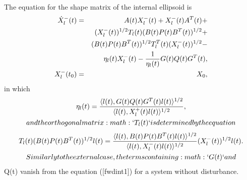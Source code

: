 \documentclass[letterpaper,10pt,english]{sphinxmanual}
\begin{document}
The equation for the shape matrix of the internal ellipsoid is
\begin{gather}
\begin{split}\begin{aligned}
\dot{X}^-_l(t) & = & A(t)X^-_l(t) + X^-_l(t)A^T(t) +\nonumber \\
& & (X_l^{-}(t))^{1/2}T_l(t)(B(t)P(t)B^T(t))^{1/2} +\nonumber \\
& & (B(t)P(t)B^T(t))^{1/2}T_l^T(t)(X_l^{-}(t))^{1/2} -\nonumber \\
& & \eta_l(t)X^-_l(t) - \frac{1}{\eta_l(t)}G(t)Q(t)G^T(t), \label{fwdint1} \\
X^-_l(t_0) & = & X_0, \label{fwdint2}\end{aligned}\end{split}\notag
\end{gather}
in which
\begin{gather}
\begin{split}  \eta_l(t) = \frac{\langle l(t),
  G(t)Q(t)G^T(t)l(t)\rangle^{1/2}}{\langle l(t), X^+_l(t)l(t)\rangle^{1/2}},\end{split}\notag\\\begin{split}and the orthogonal matrix :math:`T_l(t)` is determined by the equation\end{split}\notag
\end{gather}\begin{gather}
\begin{split}  T_l(t)(B(t)P(t)B^T(t))^{1/2}l(t) = \frac{\langle l(t),
  B(t)P(t)B^T(t)l(t)\rangle^{1/2}}{\langle l(t),
  X_l^-(t)l(t)\rangle^{1/2}}(X_l^{-}(t))^{1/2}l(t).\end{split}\notag\\\begin{split}Similarly to the external case, the terms containing :math:`G(t)` and\end{split}\notag
\end{gather}
Q(t) vanish from the equation ({[}fwdint1{]}) for a system without
disturbance.
\end{document}
